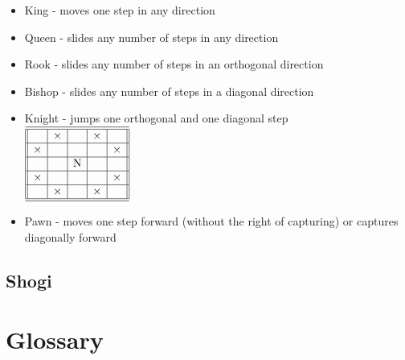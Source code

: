 \documentclass[10pt,dvipdfmx]{report}
\let\x=\times
\begin{document}
\begin{itemize}
\item King - moves one step in any direction \\
    \boardthreebythree{$\x$}{$\x$}{$\x$}{$\x$}{K}{$\x$}{$\x$}{$\x$}{$\x$}
\item Queen - slides any number of steps in any direction \\ 
\item Rook - slides any number of steps in an orthogonal direction \\ 
\item Bishop - slides any number of steps in a diagonal direction \\ 
\item Knight - jumps one orthogonal and one diagonal step \\ 
    $\begin{array}{||c|c|c|c|c||}\hline\hline
   & \x &          & \x &    \\\hline
\x &    &          &    & \x \\\hline
   &    & \text{N} &    &    \\\hline
\x &    &          &    & \x \\\hline
   & \x &          & \x &    \\\hline\hline
\end{array}$
\item Pawn - moves one step forward (without the right of capturing) or captures diagonally forward \\
\end{itemize}

\section{Shogi}

\chapter*{Glossary}

\newcommand{\gloss}[2]{\par{\bf{#1}} --- {#2}}
\end{document}
